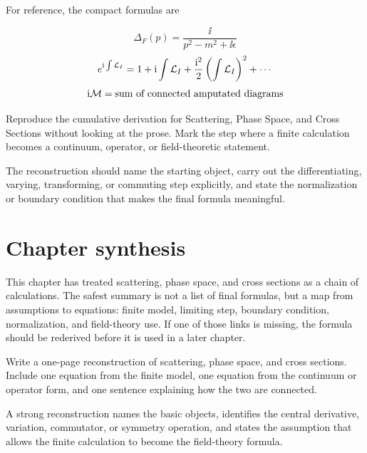 For reference, the compact formulas are

\[
  \Delta_F(p)=\frac{\ii}{p^2-m^2+\ii\epsilon}
\]
\[
  e^{\mathrm i\int\mathcal L_I}=1+\mathrm i\int\mathcal L_I+\frac{\mathrm i^2}{2}\left(\int\mathcal L_I\right)^2+\cdots
\]
\[
  \mathrm i\mathcal M=\hbox{sum of connected amputated diagrams}
\]

\begin{exercise}
Reproduce the cumulative derivation for Scattering, Phase Space, and Cross Sections without looking at the prose.  Mark the step where a finite calculation becomes a continuum, operator, or field-theoretic statement.
\begin{answer}
The reconstruction should name the starting object, carry out the differentiating, varying, transforming, or commuting step explicitly, and state the normalization or boundary condition that makes the final formula meaningful.
\end{answer}
\end{exercise}



\section{Chapter synthesis}

This chapter has treated scattering, phase space, and cross sections as a chain of calculations.  The safest summary is not a list of final formulas, but a map from assumptions to equations: finite model, limiting step, boundary condition, normalization, and field-theory use.  If one of those links is missing, the formula should be rederived before it is used in a later chapter.

\begin{exercise}
Write a one-page reconstruction of scattering, phase space, and cross sections.  Include one equation from the finite model, one equation from the continuum or operator form, and one sentence explaining how the two are connected.
\begin{answer}
A strong reconstruction names the basic objects, identifies the central derivative, variation, commutator, or symmetry operation, and states the assumption that allows the finite calculation to become the field-theory formula.
\end{answer}
\end{exercise}
